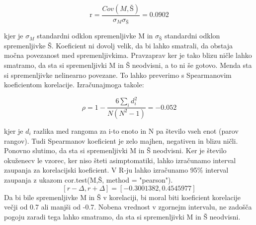 \documentclass[a4paper,11pt]{article}
\begin{document}
\begin{center}
\[\text{r} = \frac{Cov(M,Š)}{\sigma_{M} \sigma_{Š}} = 0.0902\]
\end{center} 
kjer je \(\sigma_{M}\) standardni odklon spremenljivke M in \(\sigma_{Š}\) standardni odklon spremenljivke Š. Koeficient ni dovolj velik, da bi lahko smatrali, da obstaja močna povezanost med spremenljivkima. Pravzaprav ker je tako blizu ničle lahko smatramo, da sta si spremenljivki M in Š neodvisni, a to ni še gotovo. Menda sta si spremenljivke nelinearno povezane. To lahko preverimo s Spearmanovim koeficientom korelacije. Izračunajmoga takole: 

\begin{center}
\[\rho = 1 - \frac{6\sum_{i}{}d_i^2}{N(N^2 - 1)} = -0.052\]
\end{center} 

kjer je \( d_i \) razlika med rangoma za i-to enoto in N pa število vseh enot (parov rangov). Tudi Spearmanov koeficient je zelo majhen, negativen in blizu ničli. Ponovno slutimo, da sta si spremenljivki M in Š neodvisni.
Ker je število okuženecv le vzorec, ker niso šteti asimptomatiki, lahko izračunamo interval zaupanja za korelacijski koeficient. V R-ju lahko izračunamo 95\% interval zaupanja z ukazom cor.test(M,Š, method = "pearson").
\[[r - \Delta, r + \Delta] = [-0.3001382, 0.4545977]\]
Da bi bile spremenljivke M in Š v korelaciji, bi moral biti koeficient korelacije večji od 0.7 ali manjši od -0.7. Nobena vrednost v zgornejm intervalu, ne zadošča pogoju zaradi tega lahko smatramo, da sta si spremenljivki M in Š neodvisni.
\end{document}
